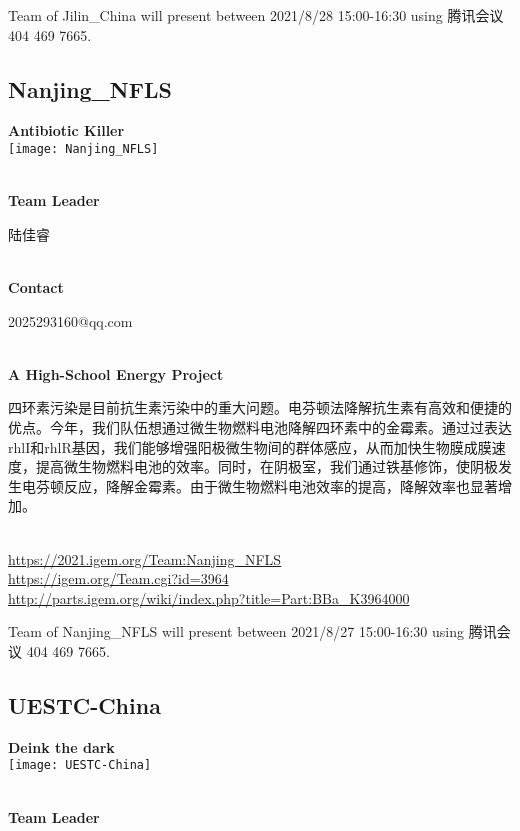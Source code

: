 Team of Jilin\_China will present between       2021/8/28 15:00-16:30  using 腾讯会议 404 469 7665.
\newpage


\subsection{\textcolor{Blu}{ Nanjing\_NFLS } }
\vspace{5mm}
\begin{center}
\large{
  \textbf{ Antibiotic Killer }\\

  \texttt{[image: Nanjing\_NFLS]}
}
\end{center}
\textbf{\\Team Leader}

  陆佳睿


\textbf{\\Contact}

  2025293160@qq.com


\textbf{\\A High-School Energy Project\\}\begin{spacing}{1.5}

四环素污染是目前抗生素污染中的重大问题。电芬顿法降解抗生素有高效和便捷的优点。今年，我们队伍想通过微生物燃料电池降解四环素中的金霉素。通过过表达rhlI和rhlR基因，我们能够增强阳极微生物间的群体感应，从而加快生物膜成膜速度，提高微生物燃料电池的效率。同时，在阴极室，我们通过铁基修饰，使阴极发生电芬顿反应，降解金霉素。由于微生物燃料电池效率的提高，降解效率也显著增加。\end{spacing}
\\

\url{https://2021.igem.org/Team:Nanjing\_NFLS }\\
\url{https://igem.org/Team.cgi?id=3964 }\\
\url{http://parts.igem.org/wiki/index.php?title=Part:BBa_K3964000 }\\


\vfill{}









Team of Nanjing\_NFLS will present between  2021/8/27 15:00-16:30       using 腾讯会议 404 469 7665.
\newpage


\subsection{\textcolor{Blu}{ UESTC-China } }
\vspace{5mm}
\begin{center}
\large{
  \textbf{ Deink the dark }\\

  \texttt{[image: UESTC-China]}
}
\end{center}
\textbf{\\Team Leader}

